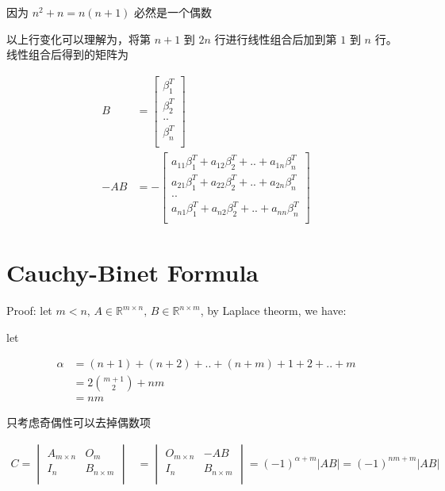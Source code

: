 \documentclass[12pt,a4paper]{ctexart}
\begin{document}
因为 $n^2+n = n(n+1)$ 必然是一个偶数

以上行变化可以理解为，将第 $n+1$ 到 $2n$ 行进行线性组合后加到第 $1$ 到 $n$ 行。线性组合后得到的矩阵为

\begin{align*}
    B &= \begin{bmatrix}
        \beta_1^T \\
        \beta_2^T \\
        .. \\
        \beta_n^T \\
    \end{bmatrix} \\
    -AB &= -\begin{bmatrix}
        a_{11}\beta_1^T + a_{12}\beta_2^T + .. + a_{1n}\beta_n^T \\
        a_{21}\beta_1^T + a_{22}\beta_2^T + .. + a_{2n}\beta_n^T \\
        .. \\
        a_{n1}\beta_1^T + a_{n2}\beta_2^T + .. + a_{nn}\beta_n^T \\
    \end{bmatrix}
\end{align*}

\section{Cauchy-Binet Formula}

Proof: let $m < n,\, A \in \mathbb{R}^{m \times n},\, B \in \mathbb{R}^{n \times m}$, by Laplace theorm, we have:

let 

\begin{align*}
    \alpha &= (n+1) + (n+2) +  .. + (n+m) + 1 + 2 + .. + m  \\
    &= 2\binom{m+1}{2} + nm \\
    &= nm 
\end{align*}

只考虑奇偶性可以去掉偶数项

\begin{align*}
    C = \begin{vmatrix}
        A_{m \times n} & O_{m}  \\
       I_n & B_{n \times m} \\
    \end{vmatrix}  &= \begin{vmatrix}
        O_{m \times n} & -AB  \\
       I_n & B_{n \times m}  \\
    \end{vmatrix}= (-1)^{\alpha + m} |AB| =(-1)^{nm + m} |AB|
\end{align*}
\end{document}
